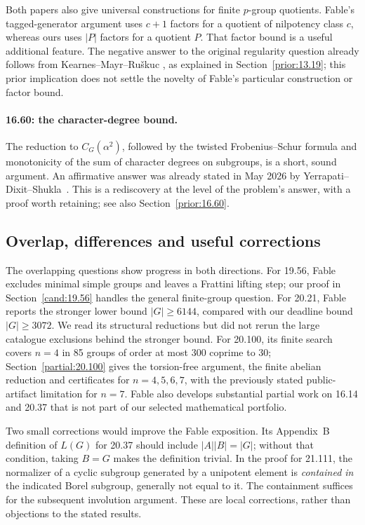 Both papers also give universal constructions for finite \(p\)-group
quotients. Fable's tagged-generator argument uses \(c+1\) factors for
a quotient of nilpotency class \(c\), whereas ours uses \(|P|\)
factors for a quotient \(P\). That factor bound is a useful additional
feature. The negative answer to the original regularity question
already follows from Kearnes--Mayr--Ru\v{s}kuc
\cite{kearnes-mayr-ruskuc}, as explained in
Section~\ref{prior:13.19}; this prior implication does not settle
the novelty of Fable's particular construction or factor bound.

\paragraph{16.60: the character-degree bound.}
The reduction to \(C_G(\alpha^2)\), followed by the twisted
Frobenius--Schur formula and monotonicity of the sum of character
degrees on subgroups, is a short, sound argument. An affirmative
answer was already stated in May 2026 by
Yerrapati--Dixit--Shukla~\cite[Theorem~3.1]{yerrapati-dixit-shukla}.
This is a rediscovery at the level of the problem's answer, with a
proof worth retaining; see also Section~\ref{prior:16.60}.

\subsection{Overlap, differences and useful corrections}

The overlapping questions show progress in both directions.
For 19.56, Fable excludes minimal simple groups and leaves a Frattini
lifting step; our proof in Section~\ref{cand:19.56} handles the
general finite-group question. For 20.21, Fable reports the stronger
lower bound \(|G|\ge6144\), compared with our deadline bound
\(|G|\ge3072\). We read its structural reductions but did not rerun
the large catalogue exclusions behind the stronger bound. For 20.100,
its finite search covers \(n=4\) in 85 groups of order at most 300
coprime to 30; Section~\ref{partial:20.100} gives the torsion-free
argument, the finite abelian reduction and certificates for
\(n=4,5,6,7\), with the previously stated public-artifact limitation
for \(n=7\). Fable also develops substantial partial work on 16.14
and 20.37 that is not part of our selected mathematical portfolio.

Two small corrections would improve the Fable exposition. Its
Appendix~B definition of \(L(G)\) for 20.37 should include
\(|A||B|=|G|\); without that condition, taking \(B=G\) makes the
definition trivial. In the proof for 21.111, the normalizer of a
cyclic subgroup generated by a unipotent element is \emph{contained
in} the indicated Borel subgroup, generally not equal to it. The
containment suffices for the subsequent involution argument. These
are local corrections, rather than objections to the stated results.


